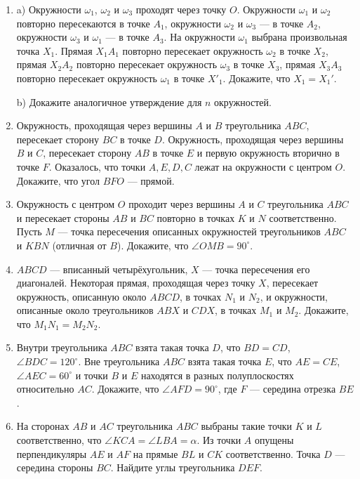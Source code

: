 \documentclass{article}
\begin{document}
\begin{enumerate}[label*=\protect\fbox{\arabic{enumi}}]
		\item a) Окружности $\omega_1$, $\omega_2$ и $\omega_3$ проходят через точку $O$. Окружности $\omega_1$ и $\omega_2$ повторно пересекаются в точке $A_1$, окружности $\omega_2$ и $\omega_3$ — в точке $A_2$, окружности $\omega_3$ и $\omega_1$ — в точке $A_3$. На окружности $\omega_1$ выбрана произвольная точка $X_1$. Прямая $X_1A_1$ повторно пересекает окружность $\omega_2$ в точке $X_2$, прямая $X_2A_2$ повторно пересекает окружность $\omega_3$ в точке $X_3$, прямая $X_3A_3$ повторно пересекает окружность $\omega_1$ в точке $X'_1$. Докажите, что $X_1=X_1'$.
		
		b) Докажите аналогичное утверждение для $n$ окружностей.
		
		\item Окружность, проходящая через вершины $A$ и $B$ треугольника $ABC$, пересекает сторону $BC$ в точке $D$. Окружность, проходящая через вершины $B$ и $C$, пересекает сторону $AB$ в точке $E$ и первую окружность вторично в точке $F$. Оказалось, что точки $A, E, D, C$ лежат на окружности с центром $O$. Докажите, что угол $BFO$ — прямой.
		
		\item Окружность с центром $O$ проходит через вершины $A$ и $C$ треугольника $ABC$ и пересекает стороны $AB$ и $BC$ повторно в точках $K$ и $N$ соответственно. Пусть $M$ — точка пересечения описанных окружностей треугольников $ABC$ и $KBN$ (отличная от $B$). Докажите, что $\angle OMB=90^\circ$.
		
		\item $ABCD$  — вписанный четырёхугольник, $X$ — точка пересечения его диагоналей. Некоторая прямая, проходящая через точку $X$, пересекает окружность, описанную около $ABCD$, в точках $N_1$ и $N_2$, и окружности, описанные около треугольников $ABX$ и $CDX$, в точках $M_1$ и $M_2$. Докажите, что $M_1N_1=M_2N_2$.
		
		\item Внутри треугольника $ABC$ взята такая точка $D$, что $BD=CD$, $\angle BDC=120^\circ$. Вне треугольника $ABC$ взята такая точка $E$, что $AE=CE$, $\angle AEC=60^\circ$ и точки $B$ и $E$ находятся в разных полуплоскостях относительно $AC$. Докажите, что $\angle AFD=90^\circ$, где $F$ — середина отрезка $BE$.
		
		\item На сторонах $AB$ и $AC$ треугольника $ABC$ выбраны такие точки $K$ и $L$ соответственно, что $\angle KCA=\angle LBA=\alpha$. Из точки $A$ опущены перпендикуляры $AE$ и $AF$ на прямые $BL$ и $CK$ соответственно. Точка $D$ — середина стороны $BC$. Найдите углы треугольника $DEF$.
		

\end{enumerate}
\end{document}
